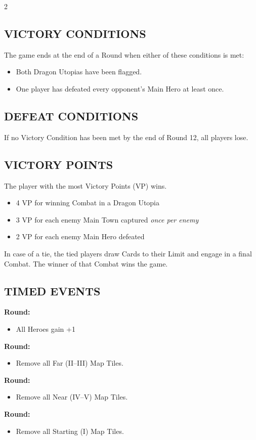 \begin{multicols}{2}
\subsection*{\MakeUppercase{Victory Conditions}}
The game ends at the end of a Round when either of these conditions is met:
\begin{itemize}
  \item Both Dragon Utopias have been flagged.
  \item One player has defeated every opponent's Main Hero at least once.
\end{itemize}

\subsection*{\MakeUppercase{Defeat Conditions}}
If no Victory Condition has been met by the end of Round 12, all players lose.

\subsection*{\MakeUppercase{Victory Points}}
The player with the most Victory Points (VP) wins.
\begin{itemize}
  \item 4 VP for winning Combat in a Dragon Utopia
  \item 3 VP for each enemy Main Town captured \textit{once per enemy}
  \item 2 VP for each enemy Main Hero defeated
\end{itemize}
In case of a tie, the tied players draw Cards to their  Limit and engage in a final Combat. The winner of that Combat wins the game.

\subsection*{\MakeUppercase{Timed Events}}
\textbf{ Round:}
\begin{itemize}
  \item All Heroes gain +1~
\end{itemize}
\textbf{ Round:}
\begin{itemize}
  \item Remove all Far (II–III) Map Tiles.
\end{itemize}
\textbf{ Round:}
\begin{itemize}
  \item Remove all Near (IV–V) Map Tiles.
\end{itemize}
\textbf{ Round:}
\begin{itemize}
  \item Remove all Starting (I) Map Tiles.
\end{itemize}


\end{multicols}
